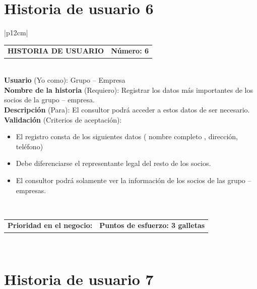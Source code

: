 \documentclass[11pt,letterpaper]{report}
\begin{document}
	\section{Historia de usuario 6}
	\begin{center}	
		\begin{tabular}{|p{12cm}|}
			\hline
			\begin{tabular}{c|c}
				\textbf{HISTORIA DE USUARIO} & \textbf{Número: 6} \\
			\end{tabular} \\ \hline
			\textbf{Usuario} (Yo como): Grupo – Empresa \\ \hline
			\textbf{Nombre de la historia} (Requiero): Registrar los datos más importantes de los socios de la grupo – empresa. \\ \hline
			\textbf{Descripción} (Para): El consultor podrá acceder a estos datos de ser necesario. \\ \hline
			\textbf{Validación} (Criterios de aceptación): \\
			\begin{minipage}{12cm}
				\begin{itemize}
					\item El registro consta de los siguientes datos ( nombre completo , dirección, teléfono)
					\item Debe diferenciarse el representante legal del resto de los socios.
					\item El consultor podrá solamente ver la información de los socios de las grupo – empresas.
				\end{itemize}
			\end{minipage} \\ \hline
			\begin{tabular}{p{6cm}|c}
				\textbf{Prioridad en el negocio: } & \textbf{Puntos de esfuerzo: 3 galletas} \\
			\end{tabular} \\ \hline
		\end{tabular}
	\end{center}
	
	\section{Historia de usuario 7}
	
\end{document}
